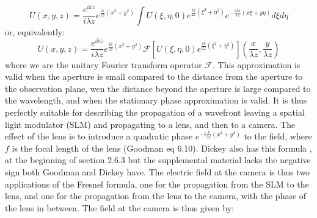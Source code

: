 \documentclass[../../main.tex]{subfiles}
\begin{document}
\begin{equation}\label{eq. Fresnel formula 1}
    U(x,y,z)=\frac{e^{ikz}}{i\lambda z}e^{\frac{ik}{2 z}(x^2+y^2)}
    \int U(\xi,\eta,0)e^{ \frac{ik}{2z}(\xi^2+\eta^2)}e^{-\frac{i 2\pi}{\lambda z}(x\xi+y\eta)}
    d\xi d\eta
\end{equation}
or, equivalently:
\begin{equation}\label{eq. Fresnel formula 2}
    U(x,y,z)=\frac{e^{ikz}}{i\lambda z}e^{\frac{ik}{2 z}(x^2+y^2)}
    \mathcal{F}\left[U(\xi,\eta,0)e^{ \frac{ik}{2z}(\xi^2+\eta^2)}\right]\left(\frac{x}{\lambda z},\frac{y}{\lambda z}\right)
\end{equation}
where we are the unitary Fourier transform operator $\mathcal{F}$. This approximation is valid when the aperture is small compared to the distance from the aperture to the observation plane, wen the distance beyond the aperture is large compared to the wavelength, and when the stationary phase approximation is valid. It is thus perfectly suitable for describing the propagation of a wavefront leaving a spatial light modulator (SLM) and propagating to a lens, and then to a camera. The effect of the lens is to introduce a quadratic phase $e^{-i\frac{k}{2f}(x^2+y^2)}$ to the field, where $f$ is the focal length of the lens (Goodman eq 6.10). Dickey also has this formula , at the beginning of section 2.6.3 but the supplemental material lacks the negative sign both Goodman and Dickey have.
The electric field at the camera is thus two applications of the Fresnel formula, one for the propagation from the SLM to the lens, and one for the propagation from the lens to the camera, with the phase of the lens in between. The field at the camera is thus given by:
\end{document}
